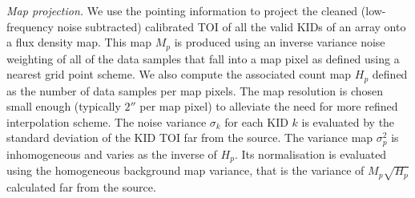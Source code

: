%
%
%

\noindent \emph{Map projection.}
\label{se:map_projection}
We use the pointing information to project the cleaned (low-frequency
noise subtracted) calibrated TOI of all the valid KIDs of an array
onto a flux density map. This map $M_p$ is produced using an inverse
variance noise weighting of all of the data samples that fall into a map
pixel as defined using a nearest grid point scheme. We also compute
the associated count map $H_p$ defined as the number of data samples
per map pixels. The map resolution
is chosen small enough (typically $2''$ per map pixel) to alleviate
the need for more refined interpolation scheme. The noise variance
$\sigma_k$ for each KID $k$ is evaluated by the standard deviation of the
KID TOI far from the source. 
{\lp The variance map $\sigma_p^2$ is inhomogeneous and varies as the
inverse of $H_p$. Its normalisation is evaluated using the
homogeneous background map variance, that is the
variance of $M_p\sqrt{H_p}$ calculated far from the source.}

